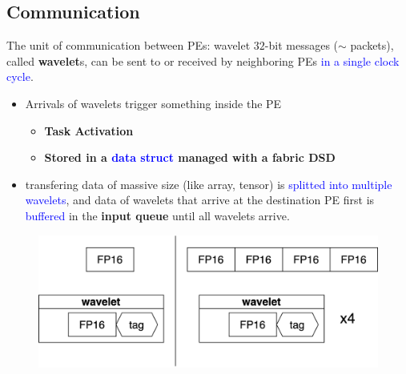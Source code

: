 \documentclass[dvipdfmx, 11pt, aspectratio=169]{beamer}   %
\begin{document}
\subsection{Communication}
\begin{frame}{The unit of communication between PEs: wavelet}
$32$-bit messages ($\sim$ packets), called \textbf{wavelet}s, can be sent to or received by neighboring PEs \textcolor{blue}{in a single clock cycle}.
\begin{itemize}
    \item Arrivals of wavelets trigger something inside the PE
    \begin{itemize}
        \item \textbf{Task Activation}
        \item \textbf{Stored in a \textcolor{blue}{data struct} managed with a fabric DSD}
    \end{itemize}
    \item transfering data of massive size (like array, tensor) is \textcolor{blue}{splitted into multiple wavelets}, 
        and data of wavelets that arrive at the destination PE first is \textcolor{blue}{buffered} in the \textbf{input queue} until all wavelets arrive.
\end{itemize}
\begin{figure}
    \includegraphics[scale=0.08]{img/wavelet.png}
\end{figure}
\end{frame}
\end{document}
